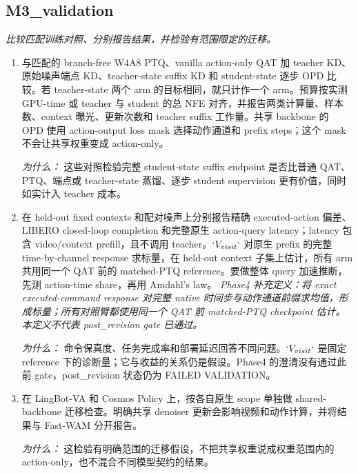 \documentclass[10pt,a4paper]{article}
\begin{document}
\subsection*{M3\_validation}
\emph{比较匹配训练对照、分别报告结果，并检验有范围限定的迁移。}
\begin{enumerate}[leftmargin=*,start=5]
  \item 与匹配的 branch-free W4A8 PTQ、vanilla action-only QAT 加 teacher KD、原始噪声端点 KD、teacher-state suffix KD 和 student-state 逐步 OPD 比较。若 teacher-state 两个 arm 的目标相同，就只计作一个 arm。预算按实测 GPU-time 或 teacher 与 student 的总 NFE 对齐，并报告两类计算量、样本数、context 曝光、更新次数和 teacher suffix 工作量。共享 backbone 的 OPD 使用 action-output loss mask 选择动作通道和 prefix steps；这个 mask 不会让共享权重变成 action-only。
\par\emph{为什么：} 这些对照检验完整 student-state suffix endpoint 是否比普通 QAT、PTQ、端点或 teacher-state 蒸馏、逐步 student supervision 更有价值，同时如实计入 teacher 成本。
  \item 在 held-out fixed contexts 和配对噪声上分别报告精确 executed-action 偏差、LIBERO closed-loop completion 和完整原生 action-query latency；latency 包含 video/context prefill，且不调用 teacher。\(`V_{visit}`\) 对原生 prefix 的完整 time-by-channel response 求标量，在 held-out context 子集上估计，所有 arm 共用同一个 QAT 前的 matched-PTQ reference。要做整体 query 加速推断，先测 action-time share，再用 Amdahl's law。
\noindent\emph{Phase4 补充定义：将 exact executed-command response 对完整 native 时间步与动作通道前缀求均值，形成标量；所有对照臂都使用同一个 QAT 前 matched-PTQ checkpoint 估计。本定义不代表 post\_revision gate 已通过。}
\par{}
\par\emph{为什么：} 命令保真度、任务完成率和部署延迟回答不同问题。\(`V_{visit}`\) 是固定 reference 下的诊断量；它与收益的关系仍是假设。Phase4 的澄清没有通过此前 gate，post\_revision 状态仍为 FAILED VALIDATION。
  \item 在 LingBot-VA 和 Cosmos Policy 上，按各自原生 scope 单独做 shared-backbone 迁移检查。明确共享 denoiser 更新会影响视频和动作计算，并将结果与 Fast-WAM 分开报告。
\par\emph{为什么：} 这检验有明确范围的迁移假设，不把共享权重说成权重范围内的 action-only，也不混合不同模型契约的结果。
\end{enumerate}
\end{document}
